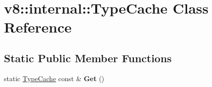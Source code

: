 \hypertarget{classv8_1_1internal_1_1_type_cache}{}\section{v8\+:\+:internal\+:\+:Type\+Cache Class Reference}
\label{classv8_1_1internal_1_1_type_cache}
\subsection*{Static Public Member Functions}
\begin{DoxyCompactItemize}
\item 
static \hyperlink{classv8_1_1internal_1_1_type_cache}{Type\+Cache} const \& {\bfseries Get} ()\hypertarget{classv8_1_1internal_1_1_type_cache_ade4bc4582b6d380e17d37d39d50928ff}{}\label{classv8_1_1internal_1_1_type_cache_ade4bc4582b6d380e17d37d39d50928ff}

\end{DoxyCompactItemize}

